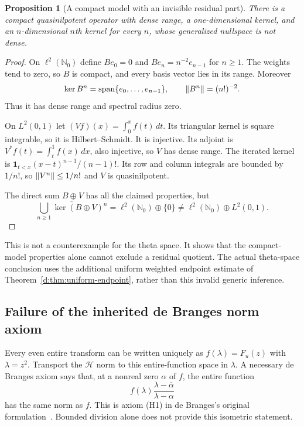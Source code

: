 \documentclass[11pt,a4paper]{article}
\numberwithin{equation}{section}
\newtheorem{proposition}[theorem]{Proposition}
\theoremstyle{definition}\newtheorem{definition}[theorem]{Definition}
\theoremstyle{remark}\newtheorem{remark}[theorem]{Remark}
\newcommand{\Hh}{\mathcal H}\newcommand{\Hw}{\mathcal H}
\begin{document}
\begin{proposition}[A compact model with an invisible residual part]\label{d:prop:countermodel}
There is a compact quasinilpotent operator with dense range, a one-dimensional kernel, and an $n$-dimensional $n$th kernel for every $n$, whose generalized nullspace is not dense.
\end{proposition}
\begin{proof}
On $\ell^2(\mathbb N_0)$ define $Be_0=0$ and $Be_n=n^{-2}e_{n-1}$ for $n\ge1$. The weights tend to zero, so $B$ is compact, and every basis vector lies in its range. Moreover
\[
 \ker B^n=\operatorname{span}\{e_0,\ldots,e_{n-1}\},\qquad
 \lVert B^n\rVert=(n!)^{-2}.
\]
Thus it has dense range and spectral radius zero.

On $L^2(0,1)$ let $(Vf)(x)=\int_0^x f(t)\,dt$. Its triangular kernel is square integrable, so it is Hilbert--Schmidt. It is injective. Its adjoint is $V^*f(t)=\int_t^1f(x)\,dx$, also injective, so $V$ has dense range. The iterated kernel is
$\boldsymbol1_{t<x}(x-t)^{n-1}/(n-1)!$. Its row and column integrals are bounded by $1/n!$, so $\lVert V^n\rVert\le1/n!$ and $V$ is quasinilpotent.

The direct sum $B\oplus V$ has all the claimed properties, but
\[
 \overline{\bigcup_{n\ge1}\ker(B\oplus V)^n}
 =\ell^2(\mathbb N_0)\oplus\{0\}
 \ne\ell^2(\mathbb N_0)\oplus L^2(0,1).
\]
\end{proof}

This is not a counterexample for the theta space. It shows that the compact-model properties alone cannot exclude a residual quotient. The actual theta-space conclusion uses the additional uniform weighted endpoint estimate of Theorem~\ref{d:thm:uniform-endpoint}, rather than this invalid generic inference.

\subsection{Failure of the inherited de Branges norm axiom}\label{d:sec:debranges}

Every even entire transform can be written uniquely as $f(\lambda)=F_u(z)$ with $\lambda=z^2$. Transport the $\Hh$ norm to this entire-function space in $\lambda$. A necessary de Branges axiom says that, at a nonreal zero $\alpha$ of $f$, the entire function
\begin{equation}\label{d:eq:zero-flip}
 f(\lambda)\frac{\lambda-\overline\alpha}{\lambda-\alpha}
\end{equation}
has the same norm as $f$. This is axiom (H1) in de Branges's original formulation~\cite{deBranges1961}. Bounded division alone does not provide this isometric statement.
\end{document}
